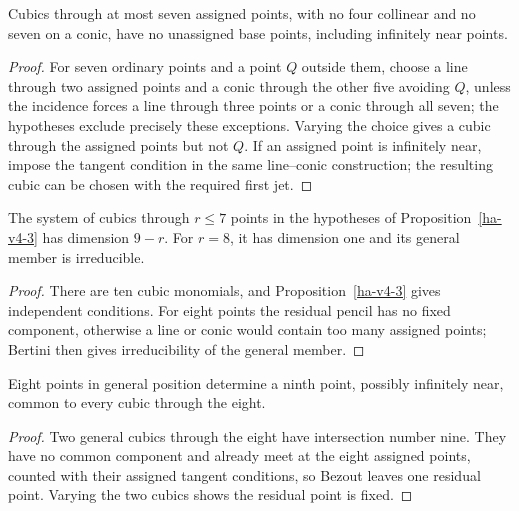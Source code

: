 \begin{proposition}
\label{ha-v4-3}
Cubics through at most seven assigned points, with no four collinear and no seven
on a conic, have no unassigned base points, including infinitely near points.

\end{proposition}
\begin{proof}
For seven ordinary points and a point \(Q\) outside them, choose a line through
two assigned points and a conic through the other five avoiding \(Q\), unless
the incidence forces a line through three points or a conic through all seven;
the hypotheses exclude precisely these exceptions.  Varying the choice gives a
cubic through the assigned points but not \(Q\).  If an assigned point is
infinitely near, impose the tangent condition in the same line--conic
construction; the resulting cubic can be chosen with the required first jet.
\end{proof}

\begin{corollary}
\label{ha-v4-4}
The system of cubics through \(r\le7\) points in the hypotheses of
Proposition~\ref{ha-v4-3} has dimension \(9-r\).  For \(r=8\), it has dimension
one and its general member is irreducible.
\end{corollary}
\begin{proof}
There are ten cubic monomials, and Proposition~\ref{ha-v4-3} gives independent
conditions.  For eight points the residual pencil has no fixed component,
otherwise a line or conic would contain too many assigned points; Bertini then
gives irreducibility of the general member.
\end{proof}

\begin{corollary}
\label{ha-v4-5}
Eight points in general position determine a ninth point, possibly infinitely
near, common to every cubic through the eight.

\end{corollary}
\begin{proof}
Two general cubics through the eight have intersection number nine.  They have
no common component and already meet at the eight assigned points, counted with
their assigned tangent conditions, so Bezout leaves one residual point.  Varying
the two cubics shows the residual point is fixed.
\end{proof}

